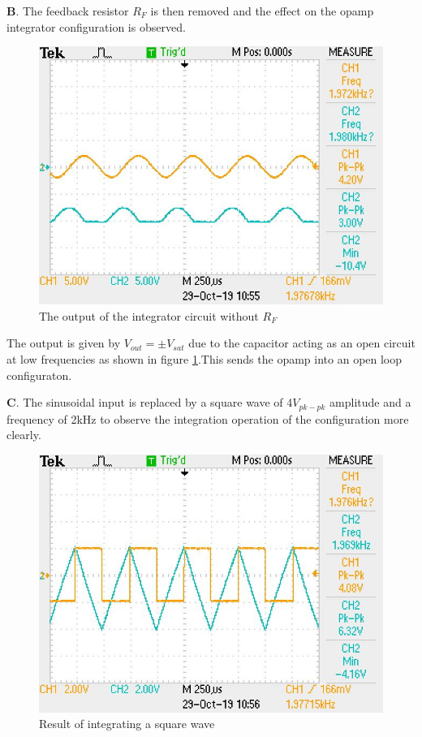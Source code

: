 \documentclass[12pt, titlepage]{article}
\theoremstyle{definition}
\begin{document}
    \textbf{B}. The feedback resistor $R_F$ is then removed and the effect on the opamp integrator configuration is observed.

    \begin{figure}
      \includegraphics[scale=0.25]{images/results_q2.jpeg}
      \caption{The output of the integrator circuit without $R_F$}
      \label{fig:results_q2}
    \end{figure}

    The output is given by $V_{out}=\pm V_{sat}$ due to the capacitor acting as an open circuit at low frequencies as shown in figure \ref{fig:results_q2}.This sends the opamp into an open loop configuraton.


    \textbf{C}. The sinusoidal input is replaced by a square wave of 4$V_{pk-pk}$ amplitude and a frequency of 2kHz to observe the integration operation of the configuration more clearly.

    \begin{figure}
      \includegraphics[scale=0.25]{images/results_q3.jpeg}
      \caption{Result of integrating a square wave}
      \label{fig:results_q3}
    \end{figure}
\end{document}
